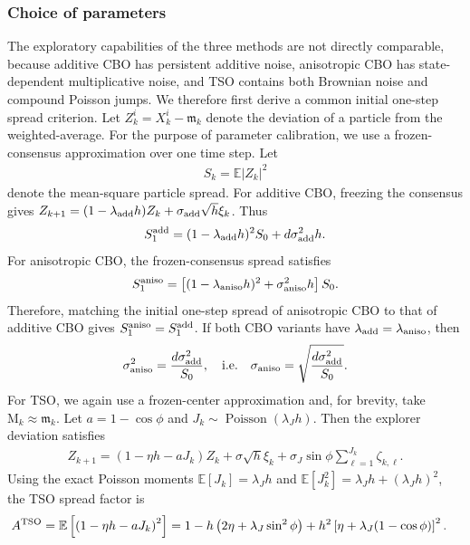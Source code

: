 \documentclass{article}
\def\m{\mathfrak{m}}
\newcommand{\E}{\mathbb{E}}
\numberwithin{equation}{section}
\begin{document}
\subsubsection{Choice of parameters}
 The exploratory capabilities of the three methods are not directly comparable, because additive CBO has persistent additive noise, anisotropic CBO has state-dependent multiplicative noise, and TSO contains both Brownian noise and compound Poisson jumps. We therefore first derive a common initial one-step spread criterion. Let $  Z_k^i = X_k^i-\m_k$ denote the deviation of a particle from the weighted-average. For the purpose of parameter calibration, we use a frozen-consensus approximation over one time step. Let
\begin{align}
    S_k = \mathbb{E}|Z_k|^2
\end{align}
denote the mean-square particle spread. For additive CBO, freezing the consensus gives $  Z_{k+1} =
    (1-\lambda_{\rm add} h)Z_k
    + \sigma_{\rm add}\sqrt{h}\xi_k$. Thus
\begin{align*}
    S_1^{\rm add} =
    (1-\lambda_{\rm add} h)^2 S_0+    d\sigma_{\rm add}^2 h.
\end{align*}
For anisotropic CBO, the frozen-consensus spread satisfies
\begin{align}
    S_1^{\rm aniso}
    =  \left[
        (1-\lambda_{\rm aniso} h)^2 + \sigma_{\rm aniso}^2 h
    \right]S_0.
\end{align}
Therefore, matching the initial one-step spread of anisotropic CBO to that of additive CBO gives $S_1^{\rm aniso}  =  S_1^{\rm add}$. If both CBO variants have $\lambda_{\rm add} = \lambda_{\rm aniso}$, then
\begin{align}\label{tso_eqn_6.9}
    \sigma_{\rm aniso}^2
    =
    \frac{d\sigma_{\rm add}^2}{S_0}, \quad \text{i.e.} \quad \sigma_{\rm aniso}
    =     \sqrt{
        \frac{d\sigma_{\rm add}^2}{S_0}}.
\end{align}
For TSO, we again use a frozen-center approximation and, for brevity, take $\mathrm{M}_k\approx \m_k$. Let $a=1-\cos\phi$ and $J_k\sim\operatorname{Poisson}(\lambda_J h)$. 
Then the explorer deviation satisfies
\begin{align*}
    Z_{k+1}
    =
    \left(1-\eta h-a J_k\right)Z_k
    + \sigma\sqrt{h}\xi_k
    +  \sigma_J\sin\phi
    \sum_{\ell=1}^{J_k}\zeta_{k,\ell}.
\end{align*}
Using the exact Poisson moments $\mathbb{E}[J_k]=\lambda_Jh $ and $\E[J_k^2]=\lambda_Jh+(\lambda_Jh)^2$, 
the TSO spread factor is
\begin{align*}
    A^{\rm TSO}
    &=
    \mathbb{E}\left[\left(1-\eta h-aJ_k\right)^2
    \right]
    = 1 - h\left(2\eta+\lambda_J\sin^2\phi\right)
    + h^2
    \left[\eta+\lambda_J(1-\cos\phi)
    \right]^2.
\end{align*}
\end{document}
